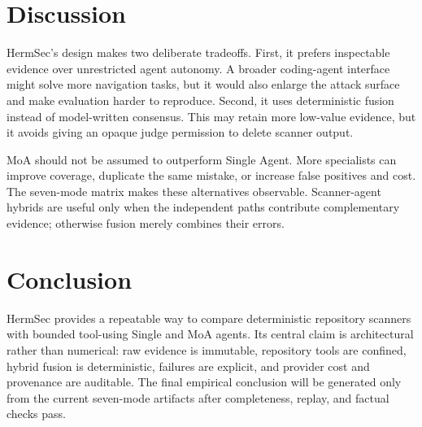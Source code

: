 \documentclass[sigconf,nonacm]{acmart}
\begin{document}
\section{Discussion}
HermSec's design makes two deliberate tradeoffs. First, it prefers inspectable evidence over unrestricted agent autonomy. A broader coding-agent interface might solve more navigation tasks, but it would also enlarge the attack surface and make evaluation harder to reproduce. Second, it uses deterministic fusion instead of model-written consensus. This may retain more low-value evidence, but it avoids giving an opaque judge permission to delete scanner output.

MoA should not be assumed to outperform Single Agent. More specialists can improve coverage, duplicate the same mistake, or increase false positives and cost. The seven-mode matrix makes these alternatives observable. Scanner-agent hybrids are useful only when the independent paths contribute complementary evidence; otherwise fusion merely combines their errors.

\section{Conclusion}
HermSec provides a repeatable way to compare deterministic repository scanners with bounded tool-using Single and MoA agents. Its central claim is architectural rather than numerical: raw evidence is immutable, repository tools are confined, hybrid fusion is deterministic, failures are explicit, and provider cost and provenance are auditable. The final empirical conclusion will be generated only from the current seven-mode artifacts after completeness, replay, and factual checks pass.



\end{document}
